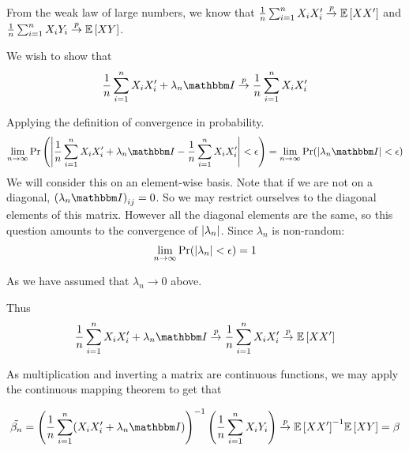 \documentclass[12pt]{paper}
\begin{document}
From the weak law of large numbers, we know that $\frac{1}{n}
\sum_{i=1}^n X_i X_i' \overset{p}{\to} \mathbb{E} \left [ X X' \right ]$ and $\frac{1}{n} \sum_{i=1}^n X_i
Y_i \overset{p}{\to} \mathbb{E} \left [ XY \right ]$.

We wish to show that
\begin{equation*}
  \frac{1}{n} \sum_{i=1}^n X_i X_i' + \lambda_n \eye \plim \frac{1}{n} \sum_{i=1}^n X_i X_i'
\end{equation*}

Applying the definition of convergence in probability.
\begin{align*}
  \lim_{n\rightarrow\infty} \Pr\left( \abs{ \frac{1}{n} \sum_{i=1}^n X_i X_i' + \lambda_n \eye -
  \frac{1}{n} \sum_{i=1}^n X_i X_i' } < \epsilon\right) &= \lim_{n\rightarrow\infty} \Pr( \abs{ \lambda_n
                                          \eye } < \epsilon)\\
\end{align*}
We will consider this on an element-wise basis. Note that if we are
not on a diagonal, $\left( \lambda_n \eye \right)_{ij} = 0$. So we may
restrict ourselves to the diagonal elements of this matrix. However
all the diagonal elements are the same, so this question amounts to
the convergence of $\left \lvert \lambda_n \right \rvert$. Since $\lambda_n$ is non-random: 
\begin{align*}
  \lim_{n\rightarrow\infty} \Pr( \left \lvert  \lambda_n \right \rvert < \epsilon) = 1
\end{align*}

As we have assumed that $\lambda_n \rightarrow 0$ above.




Thus
\begin{equation*}
  \frac{1}{n} \sum_{i=1}^n X_i X_i' + \lambda_n \eye \plim \frac{1}{n}
  \sum_{i=1}^n X_i X_i' \plim \exV{X X'}
\end{equation*}

As multiplication and inverting a matrix are continuous functions, we
may apply the continuous mapping theorem to get that 

\begin{equation*}
  \tilde{\beta_n} = \inv{ \left( \frac{1}{n} \sum_{i=1}^n ( X_i X_i' + \lambda_n
      \eye) \right)} \left( \frac{1}{n} \sum_{i=1}^n X_i Y_i \right)
  \plim \inv{ \exV{X X'}} \exV{XY} = \beta
\end{equation*}
\end{document}
